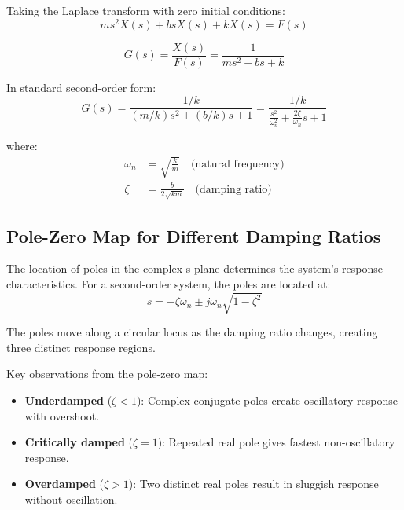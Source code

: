 Taking the Laplace transform with zero initial conditions:
\begin{equation}
ms^2X(s) + bsX(s) + kX(s) = F(s)
\end{equation}

\begin{equation}
G(s) = \frac{X(s)}{F(s)} = \frac{1}{ms^2 + bs + k}
\end{equation}

In standard second-order form:
\begin{equation}
G(s) = \frac{1/k}{(m/k)s^2 + (b/k)s + 1} = \frac{1/k}{\frac{s^2}{\omega_n^2} + \frac{2\zeta}{\omega_n}s + 1}
\end{equation}

where:
\begin{align}
\omega_n &= \sqrt{\frac{k}{m}} \quad \text{(natural frequency)} \\
\zeta &= \frac{b}{2\sqrt{km}} \quad \text{(damping ratio)}
\end{align}

\subsection{Pole-Zero Map for Different Damping Ratios}

The location of poles in the complex s-plane determines the system's response characteristics. For a second-order system, the poles are located at:
\begin{equation}
s = -\zeta\omega_n \pm j\omega_n\sqrt{1-\zeta^2}
\end{equation}

The poles move along a circular locus as the damping ratio changes, creating three distinct response regions.



Key observations from the pole-zero map:
\begin{itemize}
    \item \textbf{Underdamped} ($\zeta < 1$): Complex conjugate poles create oscillatory response with overshoot.
    \item \textbf{Critically damped} ($\zeta = 1$): Repeated real pole gives fastest non-oscillatory response.
    \item \textbf{Overdamped} ($\zeta > 1$): Two distinct real poles result in sluggish response without oscillation.
\end{itemize}

